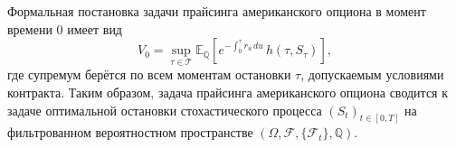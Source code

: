 Формальная постановка задачи прайсинга американского опциона в момент
времени $0$ имеет вид
\[
V_0 = \sup_{\tau\in\mathcal T}
\mathbb E_{\mathbb Q}\!\left[
e^{-\int_0^\tau r_u\,du}\, h(\tau,S_\tau)
\right],
\]
где супремум берётся по всем моментам остановки $\tau$, допускаемым
условиями контракта. Таким образом, задача прайсинга американского
опциона сводится к задаче оптимальной остановки стохастического
процесса $(S_t)_{t\in[0,T]}$ на фильтрованном вероятностном
пространстве $(\Omega,\mathcal F,\{\mathcal F_t\},\mathbb Q)$.
